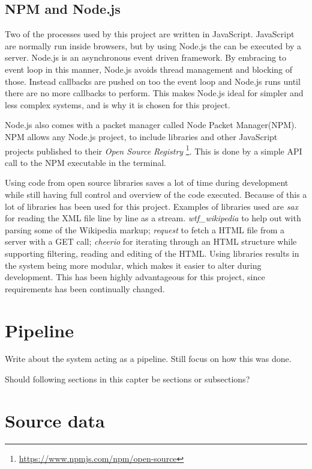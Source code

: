 \subsection{NPM and Node.js}
Two of the processes used by this project are written in JavaScript. JavaScript are normally run inside browsers, but by using Node.js\cite{node} the can be executed by a server. Node.js is an asynchronous event driven framework. By embracing to event loop in this manner, Node.js avoids thread management and blocking of those. Instead callbacks are pushed on too the event loop and Node.js runs until there are no more callbacks to perform. This makes Node.js ideal for simpler and less complex systems, and is why it is chosen for this project.

Node.js also comes with a packet manager called Node Packet Manager(NPM). NPM allows any Node.js project, to include libraries and other JavaScript projects published to their \textit{Open Source Registry} \footnote{\url{https://www.npmjs.com/npm/open-source}}. This is done by a simple API call to the NPM executable in the terminal. %

Using code from open source libraries saves a lot of time during development while still having full control and overview of the code executed. Because of this a lot of libraries has been used for this project. Examples of libraries used are \textit{sax} for reading the XML file line by line as a stream.  \textit{wtf\_wikipedia} to help out with parsing some of the Wikipedia markup;  \textit{request} to fetch a HTML file from a server with a GET call;  \textit{cheerio} for iterating through an HTML structure while supporting filtering, reading and editing of the HTML. Using libraries results in the system being more modular, which makes it easier to alter during development. This has been highly advantageous for this project, since requirements has been continually changed. 

\section{Pipeline}

Write about the system acting as a pipeline.
Still focus on how this was done.

Should following sections in this capter be sections or subsections?

\section{Source data}


